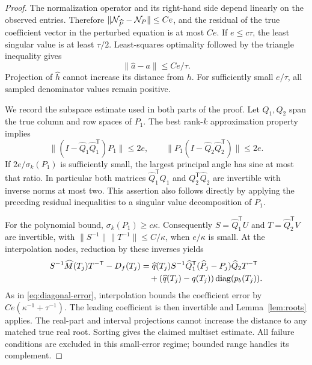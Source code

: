 \begin{proof}
The normalization operator and its right-hand side depend linearly on
the observed entries. Therefore
$\|\mathcal N_{\widehat P}-\mathcal N_P\|\le Ce$, and the residual of the true
coefficient vector in the perturbed equation is at most $Ce$.
If $e\le c\tau$, the least singular value is at least $\tau/2$.
Least-squares optimality followed by the triangle inequality gives
\begin{equation}\label{eq:algorithm-q}
 \|\widehat a-a\|\le Ce/\tau.
\end{equation}
Projection of $\widehat h$ cannot increase its distance from $h$.
For sufficiently small $e/\tau$, all sampled denominator values
remain positive.

We record the subspace estimate used in both parts of the proof.
Let $Q_1,Q_2$ span the true column and row spaces of $P_1$. The
best rank-$k$ approximation property implies
\[
 \|(I-\widehat Q_1\widehat Q_1^{\mathsf T})P_1\|\le2e,
 \qquad
 \|P_1(I-\widehat Q_2\widehat Q_2^{\mathsf T})\|\le2e.
\]
If $2e/\sigma_k(P_1)$ is sufficiently small, the largest principal
angle has sine at most that ratio. In particular both matrices
$\widehat Q_1^{\mathsf T}Q_1$ and
$Q_2^{\mathsf T}\widehat Q_2$ are invertible with inverse norms at
most two. This assertion also follows directly by applying the
preceding residual inequalities to a singular value decomposition of
$P_1$.

For the polynomial bound, $\sigma_k(P_1)\ge c\kappa$.
Consequently $S=\widehat Q_1^{\mathsf T}U$ and
$T=\widehat Q_2^{\mathsf T}V$ are invertible, with
$\|S^{-1}\|\|T^{-1}\|\le C/\kappa$, when $e/\kappa$ is small.
At the interpolation nodes, reduction by these inverses yields
\begin{align*}
 S^{-1}\widehat M(T_j)T^{-\mathsf T}-D_f(T_j)
 &=\widehat q(T_j)S^{-1}\widehat Q_1^{\mathsf T}
            (\widehat P_j-P_j)\widehat Q_2T^{-\mathsf T}\\
 &\quad +(\widehat q(T_j)-q(T_j))\operatorname{diag}(p_b(T_j)).
\end{align*}
As in \eqref{eq:diagonal-error}, interpolation bounds the coefficient
error by $Ce(\kappa^{-1}+\tau^{-1})$. The leading coefficient is
then invertible and Lemma~\ref{lem:roots} applies. The real-part and
interval projections cannot increase the distance to any matched true
real root. Sorting gives the claimed multiset estimate. All failure
conditions are excluded in this small-error regime; bounded range
handles its complement.


\end{proof}
